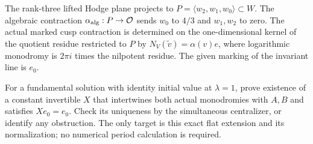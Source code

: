The rank-three lifted Hodge plane projects to
$P=\langle w_2,w_1,w_0\rangle\subset W$.
The algebraic contraction $\alpha_{\rm alg}:P\to\mathcal O$ sends $w_0$ to
$4/3$ and $w_1,w_2$ to zero. The actual marked cusp contraction is determined
on the one-dimensional kernel of the quotient residue restricted to $P$ by
$N_V(\widetilde v)=\alpha(v)e$, where logarithmic monodromy is $2\pi i$
times the nilpotent residue. The given marking of the invariant line is $e_0$.

For a fundamental solution with identity initial value at $\lambda=1$, prove
existence of a constant invertible $X$ that intertwines both actual monodromies
with $A,B$ and satisfies $Xe_0=e_0$. Check its uniqueness by the simultaneous
centralizer, or identify any obstruction. The only target is this exact flat
extension and its normalization; no numerical period calculation is required.
